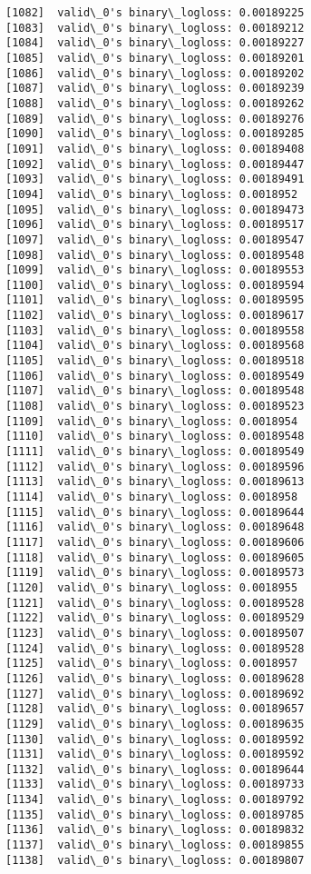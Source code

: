 \documentclass[11pt]{article}
\begin{document}
\begin{Verbatim}[commandchars=\\\{\}]
[1082]	valid\_0's binary\_logloss: 0.00189225
[1083]	valid\_0's binary\_logloss: 0.00189212
[1084]	valid\_0's binary\_logloss: 0.00189227
[1085]	valid\_0's binary\_logloss: 0.00189201
[1086]	valid\_0's binary\_logloss: 0.00189202
[1087]	valid\_0's binary\_logloss: 0.00189239
[1088]	valid\_0's binary\_logloss: 0.00189262
[1089]	valid\_0's binary\_logloss: 0.00189276
[1090]	valid\_0's binary\_logloss: 0.00189285
[1091]	valid\_0's binary\_logloss: 0.00189408
[1092]	valid\_0's binary\_logloss: 0.00189447
[1093]	valid\_0's binary\_logloss: 0.00189491
[1094]	valid\_0's binary\_logloss: 0.0018952
[1095]	valid\_0's binary\_logloss: 0.00189473
[1096]	valid\_0's binary\_logloss: 0.00189517
[1097]	valid\_0's binary\_logloss: 0.00189547
[1098]	valid\_0's binary\_logloss: 0.00189548
[1099]	valid\_0's binary\_logloss: 0.00189553
[1100]	valid\_0's binary\_logloss: 0.00189594
[1101]	valid\_0's binary\_logloss: 0.00189595
[1102]	valid\_0's binary\_logloss: 0.00189617
[1103]	valid\_0's binary\_logloss: 0.00189558
[1104]	valid\_0's binary\_logloss: 0.00189568
[1105]	valid\_0's binary\_logloss: 0.00189518
[1106]	valid\_0's binary\_logloss: 0.00189549
[1107]	valid\_0's binary\_logloss: 0.00189548
[1108]	valid\_0's binary\_logloss: 0.00189523
[1109]	valid\_0's binary\_logloss: 0.0018954
[1110]	valid\_0's binary\_logloss: 0.00189548
[1111]	valid\_0's binary\_logloss: 0.00189549
[1112]	valid\_0's binary\_logloss: 0.00189596
[1113]	valid\_0's binary\_logloss: 0.00189613
[1114]	valid\_0's binary\_logloss: 0.0018958
[1115]	valid\_0's binary\_logloss: 0.00189644
[1116]	valid\_0's binary\_logloss: 0.00189648
[1117]	valid\_0's binary\_logloss: 0.00189606
[1118]	valid\_0's binary\_logloss: 0.00189605
[1119]	valid\_0's binary\_logloss: 0.00189573
[1120]	valid\_0's binary\_logloss: 0.0018955
[1121]	valid\_0's binary\_logloss: 0.00189528
[1122]	valid\_0's binary\_logloss: 0.00189529
[1123]	valid\_0's binary\_logloss: 0.00189507
[1124]	valid\_0's binary\_logloss: 0.00189528
[1125]	valid\_0's binary\_logloss: 0.0018957
[1126]	valid\_0's binary\_logloss: 0.00189628
[1127]	valid\_0's binary\_logloss: 0.00189692
[1128]	valid\_0's binary\_logloss: 0.00189657
[1129]	valid\_0's binary\_logloss: 0.00189635
[1130]	valid\_0's binary\_logloss: 0.00189592
[1131]	valid\_0's binary\_logloss: 0.00189592
[1132]	valid\_0's binary\_logloss: 0.00189644
[1133]	valid\_0's binary\_logloss: 0.00189733
[1134]	valid\_0's binary\_logloss: 0.00189792
[1135]	valid\_0's binary\_logloss: 0.00189785
[1136]	valid\_0's binary\_logloss: 0.00189832
[1137]	valid\_0's binary\_logloss: 0.00189855
[1138]	valid\_0's binary\_logloss: 0.00189807

\end{Verbatim}
\end{document}
